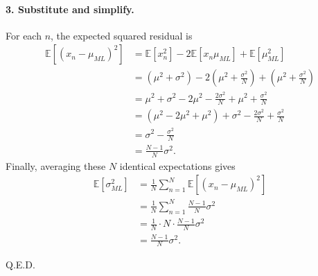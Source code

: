 \documentclass{article}
\begin{document}
\begin{tcolorbox}[breakable,colback=gray!5,colframe=gray!60,title=Solution]
\paragraph{3. Substitute and simplify.}
For each $n$, the expected squared residual is
\begin{align*}
\mathbb{E}[(x_n-\mu_{ML})^2]
&=\mathbb{E}[x_n^2]-2\mathbb{E}[x_n\mu_{ML}]
  +\mathbb{E}[\mu_{ML}^2] \\
&=(\mu^2+\sigma^2)
  -2\left(\mu^2+\frac{\sigma^2}{N}\right)
  +\left(\mu^2+\frac{\sigma^2}{N}\right) \\
&=\mu^2+\sigma^2-2\mu^2-\frac{2\sigma^2}{N}
  +\mu^2+\frac{\sigma^2}{N} \\
&=(\mu^2-2\mu^2+\mu^2)
  +\sigma^2-\frac{2\sigma^2}{N}+\frac{\sigma^2}{N} \\
&=\sigma^2-\frac{\sigma^2}{N} \\
&=\frac{N-1}{N}\sigma^2.
\end{align*}
Finally, averaging these $N$ identical expectations gives
\begin{align*}
\mathbb{E}[\sigma^2_{ML}]
&=\frac{1}{N}\sum_{n=1}^{N}\mathbb{E}[(x_n-\mu_{ML})^2] \\
&=\frac{1}{N}\sum_{n=1}^{N}\frac{N-1}{N}\sigma^2 \\
&=\frac{1}{N}\cdot N\cdot\frac{N-1}{N}\sigma^2 \\
&=\boxed{\frac{N-1}{N}\sigma^2}.
\end{align*}

Q.E.D.
\end{tcolorbox}
\end{document}

